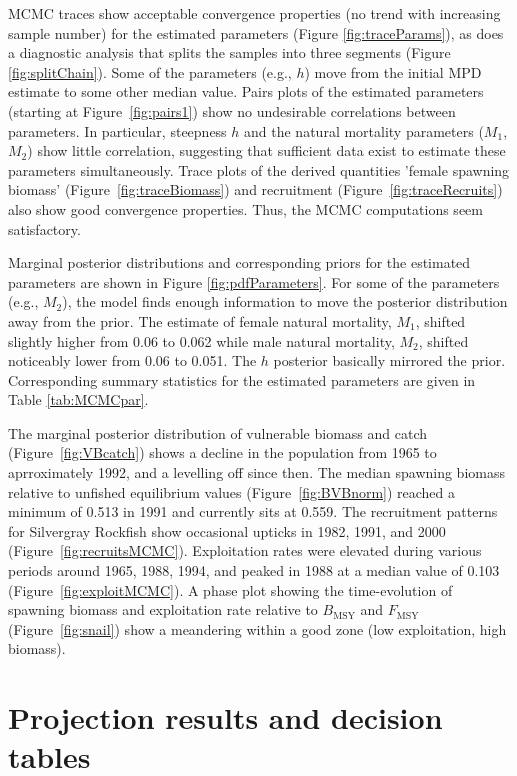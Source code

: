 \documentclass[11pt]{book}
\begin{document}
MCMC traces show acceptable convergence properties (no trend with increasing sample number) for the estimated parameters (Figure \ref{fig:traceParams}), as does a diagnostic analysis that splits the samples into three segments (Figure \ref{fig:splitChain}). Some of the parameters (e.g., $h$) move from the initial MPD estimate to some other median value.  Pairs plots of the estimated parameters (starting at Figure~\ref{fig:pairs1}) show no undesirable correlations between parameters.  In particular, steepness $h$ and the natural mortality parameters ($M_1$,$M_2$) show little correlation, suggesting that sufficient data exist to estimate these parameters simultaneously.  Trace plots of the derived quantities 'female spawning biomass' (Figure~\ref{fig:traceBiomass}) and recruitment (Figure~\ref{fig:traceRecruits}) also show good convergence properties.  Thus, the MCMC computations seem satisfactory.

Marginal posterior distributions and corresponding priors for the estimated parameters are shown in Figure \ref{fig:pdfParameters}. For some of the parameters (e.g., $M_2$), the model finds enough information to move the posterior distribution away from the prior. The estimate of female natural mortality, $M_1$, shifted slightly higher from 0.06 to 0.062 while male natural mortality, $M_2$, shifted noticeably lower from 0.06 to 0.051. The $h$ posterior basically mirrored the prior. Corresponding summary statistics for the estimated parameters are given in Table \ref{tab:MCMCpar}.


The marginal posterior distribution of vulnerable biomass and catch (Figure~\ref{fig:VBcatch}) shows a decline in the population from 1965 to aprroximately 1992, and a levelling off since then. 
The median spawning biomass relative to unfished equilibrium values (Figure~\ref{fig:BVBnorm}) reached a minimum of 0.513 in 1991 and currently sits at 0.559. 
The recruitment patterns for Silvergray Rockfish show occasional upticks in 1982, 1991, and 2000 (Figure~\ref{fig:recruitsMCMC}). 
Exploitation rates were elevated during various periods around 1965, 1988, 1994, and peaked in 1988 at a median value of 0.103 (Figure~\ref{fig:exploitMCMC}).
A phase plot showing the time-evolution of spawning biomass and exploitation rate relative to $B_\mathrm{MSY}$ and $F_\mathrm{MSY}$ (Figure~\ref{fig:snail}) show a meandering within a good zone (low exploitation, high biomass).

\section{Projection results and decision tables}
\end{document}
